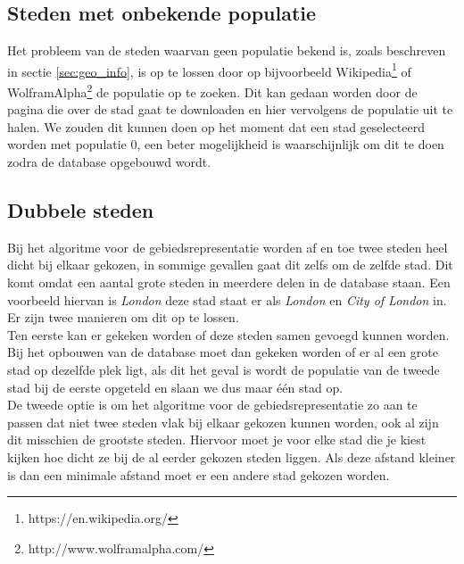 \documentclass[twoside,openright]{uva-bachelor-thesis}
\begin{document}
		\subsection{Steden met onbekende populatie}
			\label{sec:citiespop}
			Het probleem van de steden waarvan geen populatie bekend is, zoals beschreven in sectie \ref{sec:geo_info}, is op te lossen door op bijvoorbeeld Wikipedia\footnote{https://en.wikipedia.org/} of WolframAlpha\footnote{http://www.wolframalpha.com/} de populatie op te zoeken. Dit kan gedaan worden door de pagina die over de stad gaat te downloaden en hier vervolgens de populatie uit te halen. We zouden dit kunnen doen op het moment dat een stad geselecteerd worden met populatie $0$, een beter mogelijkheid is waarschijnlijk om dit te doen zodra de database opgebouwd wordt.
		\subsection{Dubbele steden}
			\label{sec:multcities}
			Bij het algoritme voor de gebiedsrepresentatie worden af en toe twee steden heel dicht bij elkaar gekozen, in sommige gevallen gaat dit zelfs om de zelfde stad. Dit komt omdat een aantal grote steden in meerdere delen in de database staan. Een voorbeeld hiervan is \textit{London} deze stad staat er als \textit{London} en \textit{City of London} in. Er zijn twee manieren om dit op te lossen.\\[0.5cm]
			Ten eerste kan er gekeken worden of deze steden samen gevoegd kunnen worden. Bij het opbouwen van de database moet dan gekeken worden of er al een grote stad op dezelfde plek ligt, als dit het geval is wordt de populatie van de tweede stad bij de eerste opgeteld en slaan we dus maar \'e\'en stad op.\\[0.5cm]
			De tweede optie is om het algoritme voor de gebiedsrepresentatie zo aan te passen dat niet twee steden vlak bij elkaar gekozen kunnen worden, ook al zijn dit misschien de grootste steden. Hiervoor moet je voor elke stad die je kiest kijken hoe dicht ze bij de al eerder gekozen steden liggen. Als deze afstand kleiner is dan een minimale afstand moet er een andere stad gekozen worden.
\end{document}

